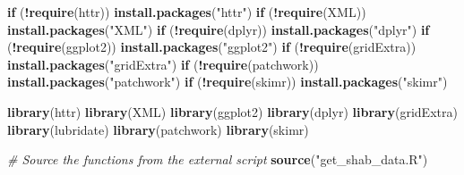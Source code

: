 \documentclass[
]{article}
\newenvironment{Shaded}{\begin{snugshade}}{\end{snugshade}}
\newcommand{\CommentTok}[1]{\textcolor[rgb]{0.56,0.35,0.01}{\textit{#1}}}
\newcommand{\ControlFlowTok}[1]{\textcolor[rgb]{0.13,0.29,0.53}{\textbf{#1}}}
\newcommand{\FunctionTok}[1]{\textcolor[rgb]{0.13,0.29,0.53}{\textbf{#1}}}
\newcommand{\NormalTok}[1]{#1}
\newcommand{\SpecialCharTok}[1]{\textcolor[rgb]{0.81,0.36,0.00}{\textbf{#1}}}
\newcommand{\StringTok}[1]{\textcolor[rgb]{0.31,0.60,0.02}{#1}}
\begin{document}
\begin{Shaded}
\begin{Highlighting}[]
\ControlFlowTok{if}\NormalTok{ (}\SpecialCharTok{!}\FunctionTok{require}\NormalTok{(httr)) }\FunctionTok{install.packages}\NormalTok{(}\StringTok{"httr"}\NormalTok{)}
\ControlFlowTok{if}\NormalTok{ (}\SpecialCharTok{!}\FunctionTok{require}\NormalTok{(XML)) }\FunctionTok{install.packages}\NormalTok{(}\StringTok{"XML"}\NormalTok{)}
\ControlFlowTok{if}\NormalTok{ (}\SpecialCharTok{!}\FunctionTok{require}\NormalTok{(dplyr)) }\FunctionTok{install.packages}\NormalTok{(}\StringTok{"dplyr"}\NormalTok{)}
\ControlFlowTok{if}\NormalTok{ (}\SpecialCharTok{!}\FunctionTok{require}\NormalTok{(ggplot2)) }\FunctionTok{install.packages}\NormalTok{(}\StringTok{"ggplot2"}\NormalTok{)}
\ControlFlowTok{if}\NormalTok{ (}\SpecialCharTok{!}\FunctionTok{require}\NormalTok{(gridExtra)) }\FunctionTok{install.packages}\NormalTok{(}\StringTok{"gridExtra"}\NormalTok{)}
\ControlFlowTok{if}\NormalTok{ (}\SpecialCharTok{!}\FunctionTok{require}\NormalTok{(patchwork)) }\FunctionTok{install.packages}\NormalTok{(}\StringTok{"patchwork"}\NormalTok{)}
\ControlFlowTok{if}\NormalTok{ (}\SpecialCharTok{!}\FunctionTok{require}\NormalTok{(skimr)) }\FunctionTok{install.packages}\NormalTok{(}\StringTok{"skimr"}\NormalTok{)}
\end{Highlighting}
\end{Shaded}

\begin{Shaded}
\begin{Highlighting}[]
\FunctionTok{library}\NormalTok{(httr)}
\FunctionTok{library}\NormalTok{(XML)}
\FunctionTok{library}\NormalTok{(ggplot2)}
\FunctionTok{library}\NormalTok{(dplyr)}
\FunctionTok{library}\NormalTok{(gridExtra)}
\FunctionTok{library}\NormalTok{(lubridate)}
\FunctionTok{library}\NormalTok{(patchwork)}
\FunctionTok{library}\NormalTok{(skimr)}
\end{Highlighting}
\end{Shaded}

\begin{Shaded}
\begin{Highlighting}[]
\CommentTok{\# Source the functions from the external script}
\FunctionTok{source}\NormalTok{(}\StringTok{"get\_shab\_data.R"}\NormalTok{)}
\end{Highlighting}
\end{Shaded}
\end{document}
